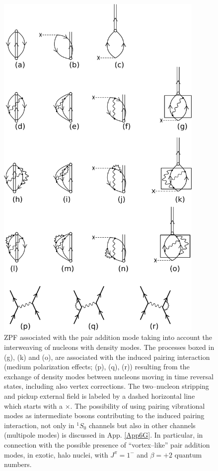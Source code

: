 \begin{figure}[h!]
\centerline {
\includegraphics*[width=10cm]{introduccion/figs/figintroA3}
}
\caption{ZPF associated with the pair addition mode taking into account the interweaving of nucleons with density modes. The processes boxed in (g), (k) and (o), are associated with the induced pairing interaction (medium polarization effects; (p), (q), (r)) resulting from the exchange of density modes between nucleons moving in time reversal states, including also vertex corrections. The two--nucleon stripping and pickup external field is labeled by a dashed horizontal line which starts with a $\times$. The possibility of using pairing vibrational modes as intermediate bosons contributing to the induced pairing interaction, not only in $^1S_0$ channels but also in other channels (multipole modes) is discussed in App. \ref{App6G}. In particular, in connection with the possible presence of ``vortex--like'' pair addition modes, in exotic, halo nuclei, with $J^\pi=1^-$ and $\beta=+2$ quantum numbers.}
\label{figintroA3}
\end{figure}
\clearpage

